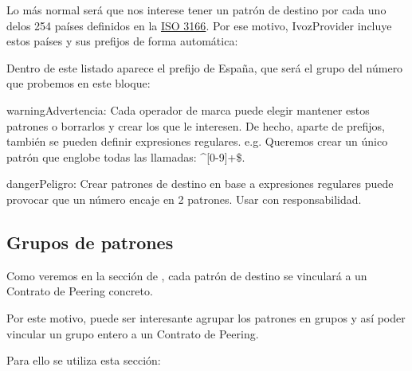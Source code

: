 \documentclass[letterpaper,10pt,spanish]{sphinxmanual}
\begin{document}

Lo más normal será que nos interese tener un patrón de destino por cada uno delos 254 países definidos en la \href{https://es.wikipedia.org/wiki/ISO\_3166}{ISO 3166}. Por ese motivo, IvozProvider incluye estos países y sus prefijos de forma automática:


Dentro de este listado aparece el prefijo de España, que será el grupo del número que probemos en este bloque:


\begin{notice}{warning}{Advertencia:}
Cada operador de marca puede elegir mantener estos patrones o borrarlos y crear los que le interesen. De hecho, aparte de prefijos, también se pueden definir expresiones regulares. e.g. Queremos crear un único patrón que englobe todas las llamadas: \textasciicircum{}{[}0-9{]}+\$.
\end{notice}

\begin{notice}{danger}{Peligro:}
Crear patrones de destino en base a expresiones regulares puede provocar que un número encaje en 2 patrones. Usar con responsabilidad.
\end{notice}


\subsection{Grupos de patrones}
\label{external_outgoing_calls/call_types:target-pattern-groups}
Como veremos en la sección de {\hyperref[external_outgoing_calls/call_routing:outgoing\string-routes]{}}, cada patrón de destino se vinculará a un Contrato de Peering concreto.

Por este motivo, puede ser interesante agrupar los patrones en grupos y así poder vincular un grupo entero a un Contrato de Peering.

Para ello se utiliza esta sección:
\end{document}
